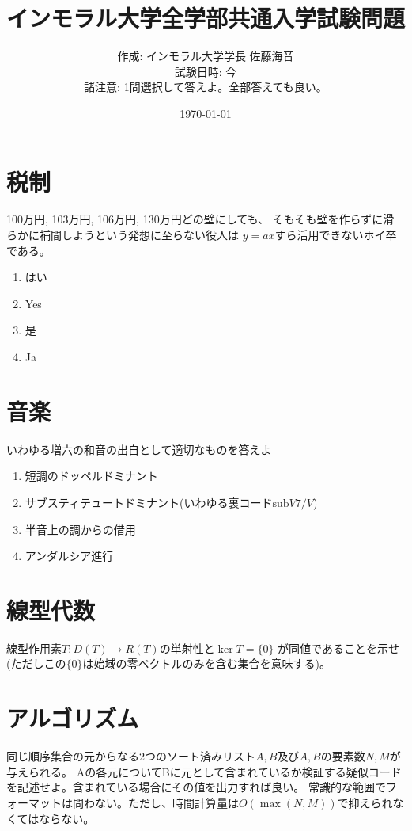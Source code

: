 \documentclass{ltjsarticle}
\title{インモラル大学全学部共通入学試験問題}
\author{
  作成: インモラル大学学長 佐藤海音 \\
  試験日時: 今 \\
  諸注意: 1問選択して答えよ。全部答えても良い。
}
\date{\today}
\begin{document}
\maketitle
\newpage

\section{税制}
100万円, 103万円, 106万円, 130万円どの壁にしても、
そもそも壁を作らずに滑らかに補間しようという発想に至らない役人は
$y=ax$すら活用できないホイ卒である。
\begin{enumerate}
  \item はい
  \item Yes
  \item 是
  \item Ja
\end{enumerate}

\section{音楽}
いわゆる増六の和音の出自として適切なものを答えよ
\begin{enumerate}
  \item 短調のドッペルドミナント
  \item サブスティテュートドミナント(いわゆる裏コード$\mathrm{sub}V7/V$)
  \item 半音上の調からの借用
  \item アンダルシア進行
\end{enumerate}

\section{線型代数}
線型作用素$T\colon D(T)\rightarrow R(T)$の単射性と$\ker T=\{0\}$
が同値であることを示せ(ただしこの$\{0\}$は始域の零ベクトルのみを含む集合を意味する)。

\section{アルゴリズム}
同じ順序集合の元からなる2つのソート済みリスト$A,B$及び$A,B$の要素数$N,M$が与えられる。
Aの各元についてBに元として含まれているか検証する疑似コードを記述せよ。含まれている場合にその値を出力すれば良い。
常識的な範囲でフォーマットは問わない。ただし、時間計算量は$O(\max(N,M))$で抑えられなくてはならない。

\newpage
\end{document}
